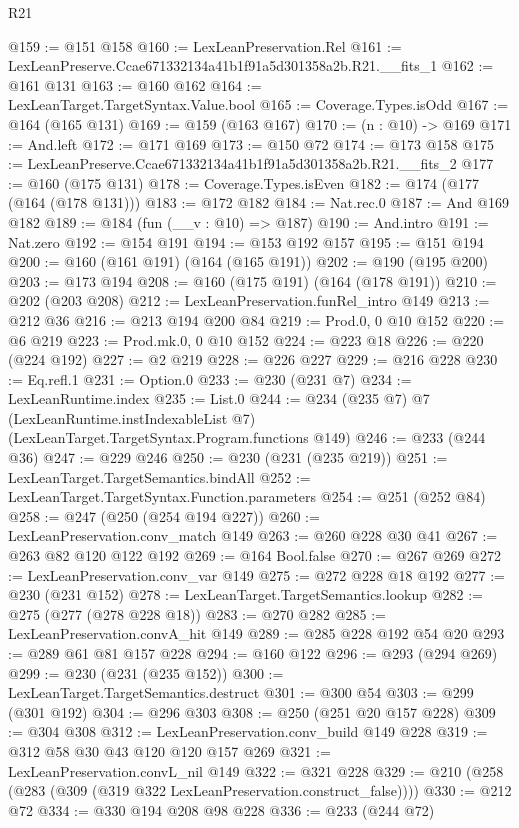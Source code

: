 \begin{lexlean}{R21}
\begin{coremodule}
@159 := @151 @158
@160 := LexLeanPreservation.Rel
@161 := LexLeanPreserve.Ccae671332134a41b1f91a5d301358a2b.R21.__fits_1
@162 := @161 @131
@163 := @160 @162
@164 := LexLeanTarget.TargetSyntax.Value.bool
@165 := Coverage.Types.isOdd
@167 := @164 (@165 @131)
@169 := @159 (@163 @167)
@170 := (n : @10) -> @169
@171 := And.left
@172 := @171 @169
@173 := @150 @72
@174 := @173 @158
@175 := LexLeanPreserve.Ccae671332134a41b1f91a5d301358a2b.R21.__fits_2
@177 := @160 (@175 @131)
@178 := Coverage.Types.isEven
@182 := @174 (@177 (@164 (@178 @131)))
@183 := @172 @182
@184 := Nat.rec.{0}
@187 := And @169 @182
@189 := @184 (fun (__v : @10) => @187)
@190 := And.intro
@191 := Nat.zero
@192 := @154 @191
@194 := @153 @192 @157
@195 := @151 @194
@200 := @160 (@161 @191) (@164 (@165 @191))
@202 := @190 (@195 @200)
@203 := @173 @194
@208 := @160 (@175 @191) (@164 (@178 @191))
@210 := @202 (@203 @208)
@212 := LexLeanPreservation.funRel_intro @149
@213 := @212 @36
@216 := @213 @194 @200 @84
@219 := Prod.{0, 0} @10 @152
@220 := @6 @219
@223 := Prod.mk.{0, 0} @10 @152
@224 := @223 @18
@226 := @220 (@224 @192)
@227 := @2 @219
@228 := @226 @227
@229 := @216 @228
@230 := Eq.refl.{1}
@231 := Option.{0}
@233 := @230 (@231 @7)
@234 := LexLeanRuntime.index
@235 := List.{0}
@244 := @234
    (@235 @7)
    @7
    (LexLeanRuntime.instIndexableList @7)
    (LexLeanTarget.TargetSyntax.Program.functions @149)
@246 := @233 (@244 @36)
@247 := @229 @246
@250 := @230 (@231 (@235 @219))
@251 := LexLeanTarget.TargetSemantics.bindAll
@252 := LexLeanTarget.TargetSyntax.Function.parameters
@254 := @251 (@252 @84)
@258 := @247 (@250 (@254 @194 @227))
@260 := LexLeanPreservation.conv_match @149
@263 := @260 @228 @30 @41
@267 := @263 @82 @120 @122 @192
@269 := @164 Bool.false
@270 := @267 @269
@272 := LexLeanPreservation.conv_var @149
@275 := @272 @228 @18 @192
@277 := @230 (@231 @152)
@278 := LexLeanTarget.TargetSemantics.lookup
@282 := @275 (@277 (@278 @228 @18))
@283 := @270 @282
@285 := LexLeanPreservation.convA_hit @149
@289 := @285 @228 @192 @54 @20
@293 := @289 @61 @81 @157 @228
@294 := @160 @122
@296 := @293 (@294 @269)
@299 := @230 (@231 (@235 @152))
@300 := LexLeanTarget.TargetSemantics.destruct
@301 := @300 @54
@303 := @299 (@301 @192)
@304 := @296 @303
@308 := @250 (@251 @20 @157 @228)
@309 := @304 @308
@312 := LexLeanPreservation.conv_build @149 @228
@319 := @312 @58 @30 @43 @120 @120 @157 @269
@321 := LexLeanPreservation.convL_nil @149
@322 := @321 @228
@329 := @210 (@258 (@283 (@309 (@319 @322 LexLeanPreservation.construct_false))))
@330 := @212 @72
@334 := @330 @194 @208 @98 @228
@336 := @233 (@244 @72)

\end{coremodule}
\end{lexlean}
